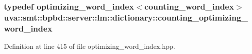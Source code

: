 \hypertarget{namespaceuva_1_1smt_1_1bpbd_1_1server_1_1lm_1_1dictionary_a61cbd647b15de785ccf4cdd26661c366}{}
\subsubsection[{counting\+\_\+optimizing\+\_\+word\+\_\+index}]{\setlength{\rightskip}{0pt plus 5cm}typedef {\bf optimizing\+\_\+word\+\_\+index}$<${\bf counting\+\_\+word\+\_\+index}$>$ {\bf uva\+::smt\+::bpbd\+::server\+::lm\+::dictionary\+::counting\+\_\+optimizing\+\_\+word\+\_\+index}}\label{namespaceuva_1_1smt_1_1bpbd_1_1server_1_1lm_1_1dictionary_a61cbd647b15de785ccf4cdd26661c366}


Definition at line 415 of file optimizing\+\_\+word\+\_\+index.\+hpp.

